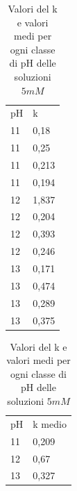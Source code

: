\begin{table}
\caption{Valori del k e valori medi per ogni classe di pH delle soluzioni $5mM$}
\begin{center}
\begin{tabular}{ll}
pH & k       \\
11 & 0,18    \\
11 & 0,25    \\
11 & 0,213   \\
11 & 0,194   \\
12 & 1,837   \\
12 & 0,204   \\
12 & 0,393   \\
12 & 0,246   \\
13 & 0,171   \\
13 & 0,474   \\
13 & 0,289   \\
13 & 0,375   \\
\end{tabular}
\begin{tabular}{ll}
pH & k medio \\
11 & 0,209 \\
12 & 0,67    \\
13 & 0,327
\end{tabular}
\end{center}
\end{table}
\pagebreak

